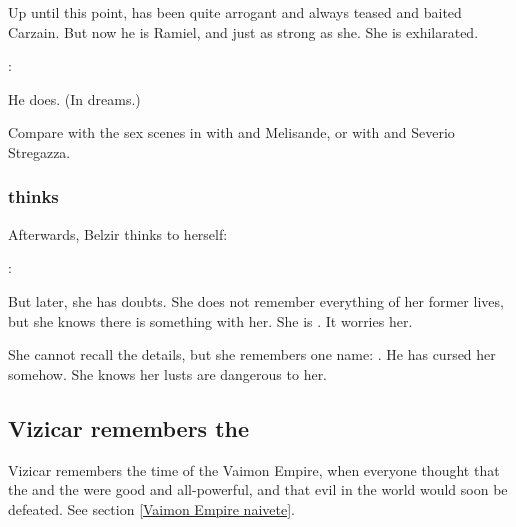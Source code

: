 \begin{garbage}
Up until this point, \Belzir{} has been quite arrogant and always teased and baited Carzain. 
But now he is Ramiel, and just as strong as she. 
She is exhilarated. 

\begin{prose}
  \Belzir: 
\end{prose}

He does. (In dreams.)

Compare with the sex scenes in  with \Phedre{} and Melisande, or with \Phedre{} and Severio Stregazza. 






\subsubsection{\Belzir{} thinks}
Afterwards, Belzir thinks to herself: 

\begin{prose}
  \Belzir:
\end{prose}

But later, she has doubts. 
She does not remember everything of her former lives, but she knows there is something  with her. 
She is . 
It worries her. 

She cannot recall the details, but she remembers one name: 
\Nexagglachel. 
He has cursed her somehow. 
She knows her lusts are dangerous to her. 











\subsection{Vizicar remembers the \angels}
Vizicar remembers the time of the Vaimon Empire, when everyone thought that the \Sephiroth{} and the \angels{} were good and all-powerful, and that evil in the world would soon be defeated. See section \ref{Vaimon Empire naivete}.


\end{garbage}
